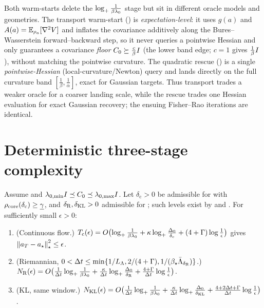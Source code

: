 \begin{remark}
\label{rem:two-initializers}
Both warm-starts delete the $\log_+\tfrac1{\beta\lambda_0}$ stage but sit in different oracle models
and geometries. The transport warm-start () is \emph{expectation-level}: it
uses $g(a)$ and $A(a)=\mathbb{E}_{\rho_a}[\nabla^2V]$ and inflates the covariance additively along the
Bures--Wasserstein forward--backward step, so it never queries a pointwise Hessian and only guarantees
a covariance \emph{floor} $C_0\succeq\tfrac c\beta I$ (the lower band edge; $c=1$ gives $\tfrac1\beta I$),
without matching the pointwise curvature. The quadratic rescue () is a single
\emph{pointwise-Hessian} (local-curvature/Newton) query and lands directly on the full curvature
band $[\tfrac1\beta,\tfrac1\alpha]$, exact for Gaussian targets. Thus transport trades a weaker
oracle for a coarser landing scale, while the rescue trades one Hessian evaluation for exact
Gaussian recovery; the ensuing Fisher--Rao iterations are identical.
\end{remark}

\section{Deterministic three-stage complexity}
\label{sec:three-stage}

\begin{theorem}
\label{thm:det-three-stage}
Assume  and $\lambda_{0,\min}I\preceq C_0\preceq\lambda_{0,\max}I$.
Let $\delta_{\mathrm c}>0$ be admissible for  with
$\rho_{\mathrm{core}}(\delta_{\mathrm c})\geq\underline{\gamma}$, and $\delta_{\mathrm{R}},\delta_{\mathrm{KL}}>0$ admissible for
; such levels exist by  and .
For sufficiently small $\epsilon>0$:
\begin{enumerate}
\item \textup{(Continuous flow.)}
$T_{\mathrm c}(\epsilon)=O\bigl(\log_+\tfrac1{\beta\lambda_0}+\kappa\log_+\tfrac{\Delta_0}{\delta_{\mathrm c}}+(4+\Gamma)\log\tfrac1\epsilon\bigr)$
gives $\left\lVert a_T-a_\star\right\rVert_\star^2\leq\epsilon$.
\item \textup{(Riemannian, $0<\Delta t\leq\min\{1/L_\Lambda,2/(4+\Gamma),1/(\beta_\star\bar\Lambda_{\delta_{\mathrm{R}}})\}$.)}
$N_{\mathrm{R}}(\epsilon)=O\bigl(\tfrac1{\Delta t}\log_+\tfrac1{\beta\lambda_0}+\tfrac\kappa{\Delta t}\log_+\tfrac{\Delta_0}{\delta_{\mathrm{R}}}+\tfrac{4+\Gamma}{\Delta t}\log\tfrac1\epsilon\bigr)$.
\item \textup{(KL, same window.)}
$N_{\mathrm{KL}}(\epsilon)=O\bigl(\tfrac1{\Delta t}\log_+\tfrac1{\beta\lambda_0}+\tfrac\kappa{\Delta t}\log_+\tfrac{\Delta_0}{\delta_{\mathrm{KL}}}+\tfrac{4+2\Delta t+\Gamma}{\Delta t}\log\tfrac1\epsilon\bigr)$.
\end{enumerate}
\end{theorem}

